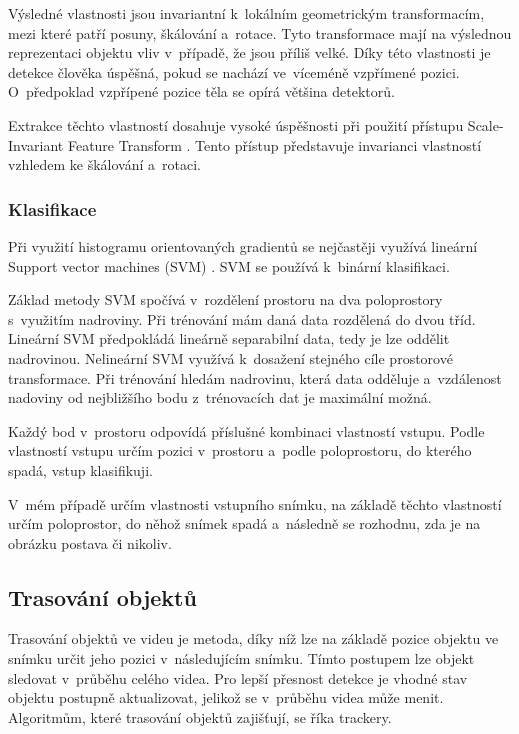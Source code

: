 Výsledné vlastnosti jsou invariantní k~lokálním geometrickým transformacím, mezi které patří posuny, škálování a~rotace. Tyto transformace mají na výslednou reprezentaci objektu vliv v~případě, že jsou příliš velké. Díky této vlastnosti je detekce člověka úspěšná, pokud se nachází ve~víceméně vzpřímené pozici. O~předpoklad vzpřípené pozice těla se opírá většina detektorů.

Extrakce těchto vlastností dosahuje vysoké úspěšnosti při použití přístupu Scale-Invariant Feature Transform \citep{SIFT}. Tento přístup představuje invarianci vlastností vzhledem ke škálování a~rotaci.


\subsubsection{Klasifikace}

Při využití histogramu orientovaných gradientů se nejčastěji využívá lineární Support vector machines (SVM) \citep{SVM}. SVM se používá k~binární klasifikaci.

Základ metody SVM spočívá v~rozdělení prostoru na dva poloprostory s~využitím nadroviny. Při trénování mám daná data rozdělená do dvou tříd. Lineární SVM předpokládá lineárně separabilní data, tedy je lze oddělit nadrovinou. Nelineární SVM využívá k~dosažení stejného cíle prostorové transformace. Při trénování hledám nadrovinu, která data odděluje a~vzdálenost nadoviny od nejbližšího bodu z~trénovacích dat je maximální možná.

Každý bod v~prostoru odpovídá příslušné kombinaci vlastností vstupu. Podle vlastností vstupu určím pozici v~prostoru a~podle poloprostoru, do kterého spadá, vstup klasifikuji.

V~mém případě určím vlastnosti vstupního snímku, na základě těchto vlastností určím poloprostor, do něhož snímek spadá a~následně se rozhodnu, zda je na obrázku postava či nikoliv.



\subsection{Trasování objektů}

Trasování objektů ve videu je metoda, díky níž lze na základě pozice objektu ve snímku určit jeho pozici v~následujícím snímku. Tímto postupem lze objekt sledovat v~průběhu celého videa. Pro lepší přesnost detekce je vhodné stav objektu postupně aktualizovat, jelikož se v~průběhu videa může menit. Algoritmům, které trasování objektů zajišťují, se říka trackery.


